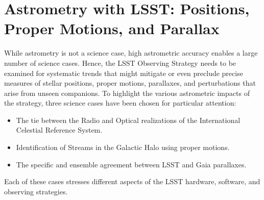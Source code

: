 \section{Astrometry with LSST: Positions, Proper Motions, and Parallax}
\def\secname{MW_Astrometry}\label{sec:\secname} %


While astrometry is not a science case, high astrometric accuracy enables
a large number of science cases.  Hence, the LSST Observing Strategy needs
to be examined for systematic trends that might mitigate or even preclude
precise measures of stellar positions, proper motions, parallaxes, and
perturbations that arise from unseen companions.  To highlight the
various astrometric impacts of the strategy, three science cases have
been chosen for particular attention:
\begin{itemize}
\item The tie between the Radio and Optical realizations of the
International Celestial Reference System.
\item Identification of Streams in the Galactic Halo using proper motions.
\item The specific and ensemble agreement between LSST and Gaia parallaxes.
\end{itemize}
Each of these cases stresses different aspects of the LSST hardware, software,
and observing strategies.

